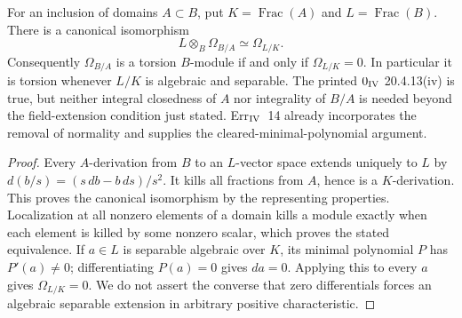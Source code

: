 \begin{proposition}\label{SA23-D-8}
For an inclusion of domains $A\subset B$, put
$K=\operatorname{Frac}(A)$ and $L=\operatorname{Frac}(B)$.
There is a canonical isomorphism
\[
 L\otimes_B\Omega_{B/A}\simeq\Omega_{L/K}.
\]
Consequently $\Omega_{B/A}$ is a torsion $B$-module if and only if
$\Omega_{L/K}=0$.  In particular it is torsion whenever $L/K$ is
algebraic and separable.  The printed $0_{\rm IV}$ 20.4.13(iv)
is true, but neither integral closedness of $A$ nor integrality of
$B/A$ is needed beyond the field-extension condition just stated.
Err$_{\rm IV}$~14 already incorporates the removal of normality
and supplies the cleared-minimal-polynomial argument.
\cite[Err$_{\rm IV}$~14, p.~348]{algEGAIV4}
\end{proposition}
\begin{proof}
Every $A$-derivation from $B$ to an $L$-vector space extends uniquely
to $L$ by $d(b/s)=(s\,db-b\,ds)/s^2$.  It kills all fractions
from $A$, hence is a $K$-derivation.  This proves the canonical
isomorphism by the representing properties.  Localization at all
nonzero elements of a domain kills a module exactly when each
element is killed by some nonzero scalar, which proves the stated
equivalence.  If $a\in L$ is separable algebraic over $K$, its
minimal polynomial $P$ has $P'(a)\ne0$; differentiating $P(a)=0$
gives $da=0$.  Applying this to every $a$ gives
$\Omega_{L/K}=0$.  We do not assert the converse that zero
differentials forces an algebraic separable extension in arbitrary
positive characteristic.
\end{proof}

